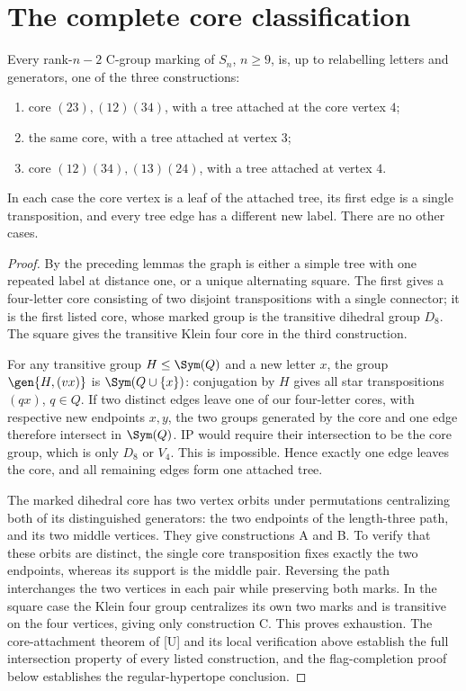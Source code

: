 \section{The complete core classification}
\begin{theorem}\label{thm:classification}
Every rank-$n-2$ C-group marking of $S_n$, $n\geq9$, is, up to
relabelling letters and generators, one of the three constructions:
\begin{enumerate}
\item core $(23),(12)(34)$, with a tree attached at the core vertex $4$;
\item the same core, with a tree attached at vertex $3$;
\item core $(12)(34),(13)(24)$, with a tree attached at vertex $4$.
\end{enumerate}
In each case the core vertex is a leaf of the attached tree, its first
edge is a single transposition, and every tree edge has a different
new label. There are no other cases.
\end{theorem}
\begin{proof}
By the preceding lemmas the graph is either a simple tree with one
repeated label at distance one, or a unique alternating square. The
first gives a four-letter core consisting of two disjoint transpositions
with a single connector; it is the first listed core, whose marked
group is the transitive dihedral group $D_8$. The square gives the
transitive Klein four core in the third construction.

For any transitive group $H\leq\Sym(Q)$ and a new letter $x$, the group
$\gen{H,(vx)}$ is $\Sym(Q\cup\{x\})$: conjugation by $H$ gives all
star transpositions $(qx)$, $q\in Q$. If two distinct edges leave
one of our four-letter cores, with respective new endpoints $x,y$,
the two groups generated by the core and one edge therefore intersect
in $\Sym(Q)$. IP would require their intersection to be the core group,
which is only $D_8$ or $V_4$. This is impossible. Hence exactly one edge
leaves the core, and all remaining edges form one attached tree.

The marked dihedral core has two vertex orbits under permutations
centralizing both of its distinguished generators: the two endpoints
of the length-three path, and its two middle vertices. They give
constructions A and B. To verify that these orbits are distinct, the
single core transposition fixes exactly the two endpoints, whereas
its support is the middle pair. Reversing the path interchanges the
two vertices in each pair while preserving both marks. In the square
case the Klein four group centralizes its own two marks and is
transitive on the four vertices, giving only construction C.
This proves exhaustion. The core-attachment theorem of [U] and its local verification above establish
the full intersection property of every listed construction, and the
flag-completion proof below establishes the regular-hypertope conclusion.
\end{proof}

